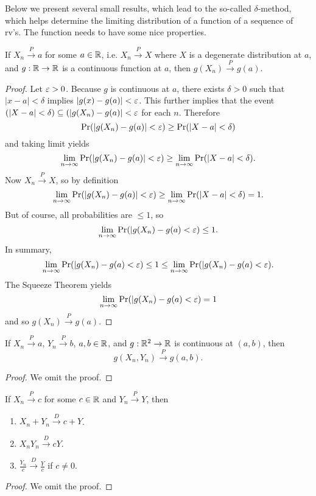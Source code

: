 \documentclass[11pt,fleqn]{book} %
\begin{document}
\begin{remark} \label{rmk:444}
Below we present several small results, which lead to the so-called \(\delta\)-method, which helps determine the limiting distribution of a function of a sequence of rv's. The function needs to have some nice properties.
\end{remark}

\begin{proposition} \label{prop:445}
If \(X_n\xrightarrow{P} a\) for some \(a \in \mathbb{R}\), i.e. \(X_n\xrightarrow{P}X\) where \(X\) is a degenerate distribution at \(a\), and \(g:\mathbb{R}\rightarrow\mathbb{R}\) is a continuous function at \(a\), then \(g(X_n) \xrightarrow{P} g(a)\).
\end{proposition}
\begin{proof}
Let \(\varepsilon > 0\). Because \(g\) is continuous at \(a\), there exists \(\delta > 0\) such that \(|x - a| < \delta\) implies \(|g(x) - g(a)| < \varepsilon\). This further implies that the event \((|X - a| < \delta) \subseteq (|g(X_n) - g(a)| < \varepsilon\) for each \(n\). Therefore
\[
\Pr(|g(X_n) - g(a)| < \varepsilon) \geq \Pr(|X - a| < \delta)
\]
and taking limit yields
\[
\lim_{n\rightarrow\infty}\Pr(|g(X_n) - g(a)| < \varepsilon) \geq \lim_{n\rightarrow\infty} \Pr(|X - a| < \delta).
\]
\indent Now \(X_n \xrightarrow{P} X\), so by definition
\[
\lim_{n\rightarrow\infty}\Pr(|g(X_n) - g(a)| < \varepsilon) \geq \lim_{n\rightarrow\infty} \Pr(|X - a| < \delta) = 1.
\]
\indent But of course, all probabilities are \(\leq 1\), so
\[
\lim_{n\rightarrow\infty}\Pr(|g(X_n) - g(a) < \varepsilon) \leq 1.
\]
\indent In summary,
\[
\lim_{n\rightarrow\infty}\Pr(|g(X_n) - g(a) < \varepsilon) \leq 1 \leq \lim_{n\rightarrow\infty}\Pr(|g(X_n) - g(a) < \varepsilon).
\]
\indent The Squeeze Theorem yields
\[
\lim_{n\rightarrow\infty}\Pr(|g(X_n) - g(a) < \varepsilon) = 1
\]
and so \(g(X_n) \xrightarrow{P} g(a)\).
\end{proof}

\begin{proposition} \label{prop:446}
If \(X_n\xrightarrow{P} a\), \(Y_n \xrightarrow{P} b\), \(a, b \in \mathbb{R}\), and \(g:\mathbb{R}^2\rightarrow\mathbb{R}\) is continuous at \((a, b)\), then
\[
g(X_n, Y_n) \xrightarrow{P} g(a, b).
\]
\end{proposition}
\begin{proof} We omit the proof.\end{proof}

\begin{theorem}
\label{thm:447}
If \(X_n\xrightarrow{P} c\) for some \(c \in \mathbb{R}\) and \(Y_n \xrightarrow{P} Y\), then
\begin{enumerate}
\item \(X_n + Y_n \xrightarrow{D} c + Y\).
\item \(X_nY_n \xrightarrow{D} cY\).
\item \(\frac{Y_n}{c} \xrightarrow{D} \frac{Y}{c}\) if \(c \neq 0\).
\end{enumerate}
\end{theorem}
\begin{proof} We omit the proof.\end{proof}
\end{document}
